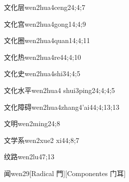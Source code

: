 \begin{verbete}{文化层}{wen2hua4ceng2}{4;4;7}
\end{verbete}

\begin{verbete}{文化宫}{wen2hua4gong1}{4;4;9}
\end{verbete}

\begin{verbete}{文化圈}{wen2hua4quan1}{4;4;11}
\end{verbete}

\begin{verbete}{文化热}{wen2hua4re4}{4;4;10}
\end{verbete}

\begin{verbete}{文化史}{wen2hua4shi3}{4;4;5}
\end{verbete}

\begin{verbete}{文化水平}{wen2hua4 shui3ping2}{4;4;4;5}
\end{verbete}

\begin{verbete}{文化障碍}{wen2hua4zhang4'ai4}{4;4;13;13}
\end{verbete}

\begin{verbete}{文明}{wen2ming2}{4;8}
\end{verbete}

\begin{verbete}{文学系}{wen2xue2 xi4}{4;8;7}
\end{verbete}

\begin{verbete}{纹路}{wen2lu4}{7;13}
\end{verbete}

\begin{verbete}{闻}{wen2}{9}[Radical 門][Componentes 门耳]
\end{verbete}

